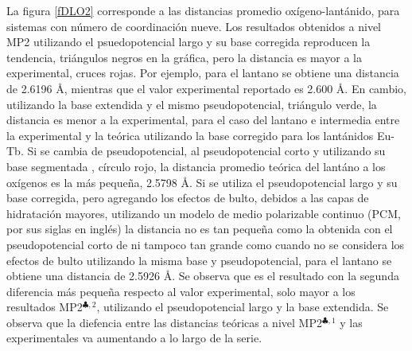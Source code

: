 La figura \ref{fDLO2} corresponde a las distancias promedio
ox\'igeno-lant\'anido, para sistemas con n\'umero de coordinaci\'on 
nueve. Los resultados obtenidos a nivel MP2 utilizando el 
psuedopotencial largo \citep{Dolg1989} y su base corregida 
\citep{Dolg1993} reproducen la tendencia, tri\'angulos 
negros en la gr\'afica, pero la distancia es mayor a la experimental,
cruces rojas. Por ejemplo, para el lantano se obtiene una distancia de
2.6196 \AA, mientras que el valor experimental reportado es 2.600 \AA.
En cambio, utilizando la base extendida \citep{Yang2005} y el mismo 
pseudopotencial, tri\'angulo verde, la distancia es menor a la 
experimental, para el caso del lantano e intermedia entre la 
experimental y la te\'orica utilizando la base corregido para los 
lant\'anidos Eu-Tb. Si se cambia de pseudopotencial, al 
pseudopotencial corto \citep{Cao2001} y utilizando su base segmentada
\citep{Cao2002}, c\'irculo rojo, la distancia promedio te\'orica del 
lant\'ano a los ox\'igenos es la m\'as peque\~na, 2.5798 \AA. Si se 
utiliza el pseudopotencial largo y su base corregida, pero agregando 
los efectos de bulto, debidos a las capas de hidrataci\'on mayores, 
utilizando un modelo de medio polarizable continuo (PCM, por sus 
siglas en ingl\'es) la distancia no es tan peque\~na como la obtenida
con el pseudopotencial corto de \cite{Cao2001} ni tampoco tan grande 
como cuando no se considera los efectos de bulto utilizando la misma 
base y pseudopotencial, para el lantano se obtiene una distancia de 
2.5926 \AA. Se observa que es el resultado con la segunda diferencia 
m\'as peque\~na respecto al valor experimental, solo mayor a los 
resultados MP2$^{\clubsuit,2}$, utilizando el pseudopotencial largo y
la base extendida. Se observa que la diefencia entre las distancias
te\'oricas a nivel MP2$^{\clubsuit,1}$ y las experimentales va 
aumentando a lo largo de la serie.

